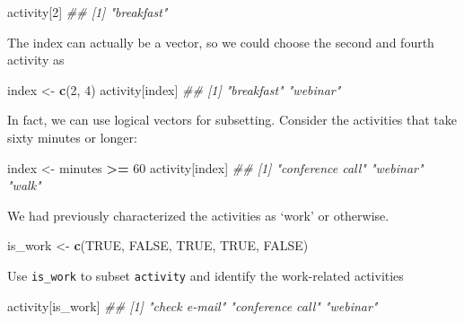 \documentclass[
]{book}
\newenvironment{Shaded}{\begin{snugshade}}{\end{snugshade}}
\newcommand{\CommentTok}[1]{\textcolor[rgb]{0.56,0.35,0.01}{\textit{#1}}}
\newcommand{\DecValTok}[1]{\textcolor[rgb]{0.00,0.00,0.81}{#1}}
\newcommand{\KeywordTok}[1]{\textcolor[rgb]{0.13,0.29,0.53}{\textbf{#1}}}
\newcommand{\NormalTok}[1]{#1}
\newcommand{\OperatorTok}[1]{\textcolor[rgb]{0.81,0.36,0.00}{\textbf{#1}}}
\newcommand{\OtherTok}[1]{\textcolor[rgb]{0.56,0.35,0.01}{#1}}
\newcommand{\StringTok}[1]{\textcolor[rgb]{0.31,0.60,0.02}{#1}}
\begin{document}
\begin{Shaded}
\begin{Highlighting}[]
\NormalTok{activity[}\DecValTok{2}\NormalTok{]}
\CommentTok{## [1] "breakfast"}
\end{Highlighting}
\end{Shaded}

The index can actually be a vector, so we could choose the second and fourth activity as

\begin{Shaded}
\begin{Highlighting}[]
\NormalTok{index <-}\StringTok{ }\KeywordTok{c}\NormalTok{(}\DecValTok{2}\NormalTok{, }\DecValTok{4}\NormalTok{)}
\NormalTok{activity[index]}
\CommentTok{## [1] "breakfast" "webinar"}
\end{Highlighting}
\end{Shaded}

In fact, we can use logical vectors for subsetting. Consider the activities that take sixty minutes or longer:

\begin{Shaded}
\begin{Highlighting}[]
\NormalTok{index <-}\StringTok{ }\NormalTok{minutes }\OperatorTok{>=}\StringTok{ }\DecValTok{60}
\NormalTok{activity[index]}
\CommentTok{## [1] "conference call" "webinar"         "walk"}
\end{Highlighting}
\end{Shaded}

We had previously characterized the activities as `work' or otherwise.

\begin{Shaded}
\begin{Highlighting}[]
\NormalTok{is_work <-}\StringTok{ }\KeywordTok{c}\NormalTok{(}\OtherTok{TRUE}\NormalTok{, }\OtherTok{FALSE}\NormalTok{, }\OtherTok{TRUE}\NormalTok{, }\OtherTok{TRUE}\NormalTok{, }\OtherTok{FALSE}\NormalTok{)}
\end{Highlighting}
\end{Shaded}

Use \texttt{is\_work} to subset \texttt{activity} and identify the work-related activities

\begin{Shaded}
\begin{Highlighting}[]
\NormalTok{activity[is_work]}
\CommentTok{## [1] "check e-mail"    "conference call" "webinar"}
\end{Highlighting}
\end{Shaded}
\end{document}
